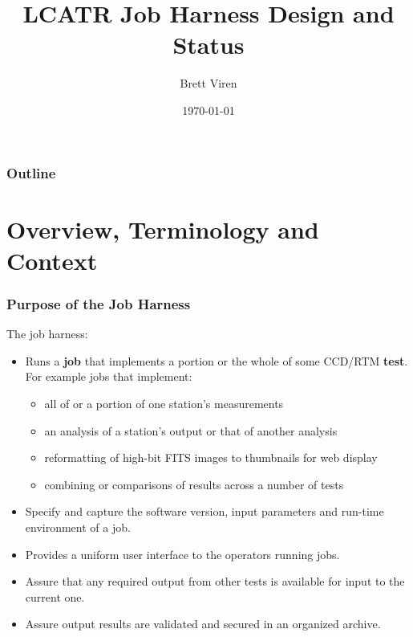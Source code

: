 \documentclass[xcolor=dvipsnames]{beamer}
\title[Job Harness]{LCATR Job Harness Design and Status}
\author{Brett Viren}
\institute[BNL]
{
  Physics Department

  \texttt{[image: bnl-logo]}
}
\date{\today}
\begin{document}
\maketitle

\begin{frame}
\frametitle{Outline}
\tableofcontents
\end{frame}

\section{Overview, Terminology and Context}

\begin{frame}
  \frametitle{Purpose of the Job Harness}

  The job harness:
  \begin{itemize}
  \item Runs a \textbf{job} that implements a portion or the whole of
    some CCD/RTM \textbf{test}.  For example jobs that implement:
    \begin{itemize}
    \item all of or a portion of one station's measurements
    \item an analysis of a station's output or that of another analysis
    \item reformatting of high-bit FITS images to thumbnails for web display
    \item combining or comparisons of results across a number of tests
    \end{itemize}
  \item Specify and capture the software version, input parameters and
    run-time environment of a job.
  \item Provides a uniform user interface to the operators running jobs.
  \item Assure that any required output from other tests is available for
    input to the current one.
  \item Assure output results are validated and secured in an
    organized archive.
  \end{itemize}
\end{frame}
\end{document}
